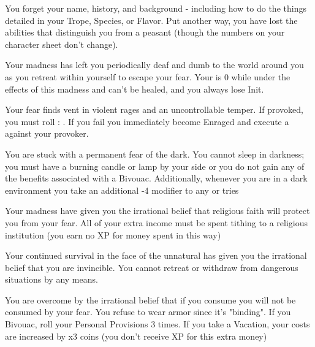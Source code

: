{  

  You forget your name, history, and background - including how to do the things detailed in your Trope, Species, or Flavor.  Put another way, you have lost the abilities that distinguish you from a peasant (though the numbers on your character sheet don't change).


  Your madness has left you periodically deaf and dumb to the world around you as you retreat within yourself to escape your fear. Your  is 0 while under the effects of this madness and can't be healed, and you always lose Init.


  Your fear finds vent in violent rages and an uncontrollable temper. If provoked, you must roll \RS : \FOC.  If you fail you immediately become Enraged and execute a  against your provoker.


  You are stuck with a permanent fear of the dark. You cannot sleep in darkness; you must have a burning candle or lamp by your side or you do not gain any of the benefits associated with a Bivouac. Additionally, whenever you are in a dark environment you take an additional -4 modifier to any \RO or \RB tries


  Your madness have given you the irrational belief that religious faith will protect you from your fear. All of your extra income must be spent tithing to a religious institution (you earn no XP for money spent in this way)

  \cbreak


  Your continued survival in the face of the unnatural has given you the irrational belief that you are invincible. You cannot retreat or withdraw from dangerous situations by any means.


  You are overcome by the irrational belief that if you consume you will not be consumed by your fear. You refuse to wear armor since it's "binding".  If you Bivouac, roll your Personal Provisions 3 times.  If you take a Vacation, your costs are increased by x3 coins (you don't receive XP for this extra money)

}
